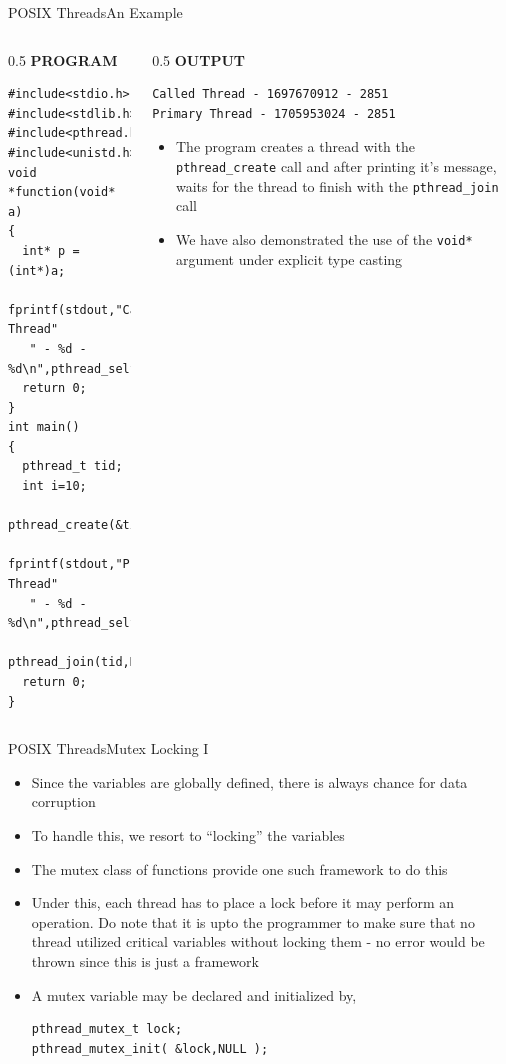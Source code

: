 \documentclass{beamer}
\begin{document}
\begin{frame}[fragile]{POSIX Threads}{An Example}
  \begin{columns}
    \begin{column}{0.5\textwidth}
      \textbf{PROGRAM}
\begin{tiny}
\begin{verbatim}
#include<stdio.h>
#include<stdlib.h>
#include<pthread.h>
#include<unistd.h>
void *function(void* a)
{
  int* p = (int*)a;
  fprintf(stdout,"Called Thread"
   " - %d - %d\n",pthread_self(),getpid());  
  return 0;
}
int main()
{
  pthread_t tid;
  int i=10;
  pthread_create(&tid,NULL,function,&i);
  fprintf(stdout,"Primary Thread"
   " - %d - %d\n",pthread_self(),getpid());
  pthread_join(tid,NULL);
  return 0;
}
\end{verbatim}
\end{tiny}
    \end{column}
    \begin{column}{0.5\textwidth}
      {\centering\textbf{OUTPUT}}\\
      \begin{tiny}
\begin{verbatim}
Called Thread - 1697670912 - 2851
Primary Thread - 1705953024 - 2851
\end{verbatim}
      \end{tiny}
      \begin{itemize}
        \item The program creates a thread with the
          \verb|pthread_create| call and after printing it's message,
          waits for the thread to finish with the \verb|pthread_join|
          call
        \item We have also demonstrated the use of the \verb|void*|
          argument under explicit type casting     
      \end{itemize}
    \end{column}
  \end{columns}
\end{frame}

\begin{frame}[fragile]{POSIX Threads}{Mutex Locking I}
  \begin{itemize}
    \item Since the variables are globally defined, there is always
      chance for data corruption
    \item To handle this, we resort to ``locking'' the variables
    \item The mutex class of functions provide one such framework to
      do this
    \item Under this, each thread has to place a lock before it may
      perform an operation. Do note that it is upto the programmer to
      make sure that no thread utilized critical variables without
      locking them - no error would be thrown since this is just a
      framework
    \item A mutex variable may be declared and initialized by,
\begin{verbatim}
pthread_mutex_t lock;
pthread_mutex_init( &lock,NULL );
\end{verbatim}
  \end{itemize}
\end{frame}
\end{document}
